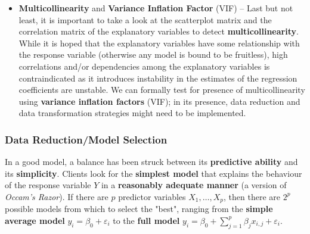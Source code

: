 \begin{itemize}
\item \textbf{Multicollinearity} and \textbf{Variance Inflation Factor} (VIF) -- Last but not least, it is important to take a look at the scatterplot matrix and the correlation matrix of the explanatory variables to detect \textbf{multicollinearity}. While it is hoped that the explanatory variables have some relationship with the response variable (otherwise any model is bound to be fruitless), high correlations and/or dependencies among the explanatory variables is contraindicated as it introduces instability in the estimates of the regression coefficients are unstable. We can formally test for presence of multicollinearity using \textbf{variance inflation factors} (VIF); in its presence, data reduction and data transformation strategies might need to be implemented. 
\end{itemize}



\subsubsection{Data Reduction/Model Selection} \label{sec:Data.Red}
In a good model, a balance has been struck between its \textbf{predictive ability} and its \textbf{simplicity}. Clients look for the \textbf{simplest model} that explains the behaviour of the response variable $Y$ in a \textbf{reasonably adequate manner} (a version of \textit{Occam's Razor}). If there are $p$ predictor variables $X_1,\ldots,X_p$, then there are $2^{p}$ possible models from which to select the "best", ranging from the \textbf{simple average model} ${y}_{i}=\beta_{0}+\varepsilon_{i}$ to the \textbf{full model} ${y}_{i}=\beta_{0}+\sum_{j=1}^{p}\beta_{j}x_{i,j}+\varepsilon_{i}$.

